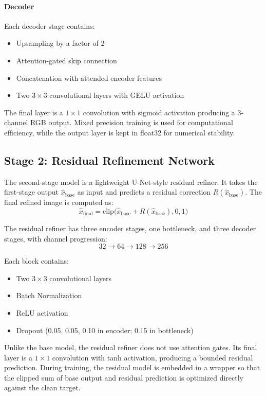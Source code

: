 \documentclass[10pt,twocolumn,letterpaper]{article}
\begin{document}
\paragraph{Decoder}
Each decoder stage contains:
\begin{itemize}
\item Upsampling by a factor of 2
\item Attention-gated skip connection
\item Concatenation with attended encoder features
\item Two $3\times3$ convolutional layers with GELU activation
\end{itemize}

The final layer is a $1\times1$ convolution with sigmoid activation producing a 3-channel RGB output. Mixed precision training is used for computational efficiency, while the output layer is kept in float32 for numerical stability.

\subsection{Stage 2: Residual Refinement Network}

The second-stage model is a lightweight U-Net-style residual refiner. It takes the first-stage output $\hat{x}_{\text{base}}$ as input and predicts a residual correction $R(\hat{x}_{\text{base}})$. The final refined image is computed as:
\begin{equation*}
\hat{x}_{\text{final}} = \mathrm{clip}\big(\hat{x}_{\text{base}} + R(\hat{x}_{\text{base}}), 0, 1\big)
\end{equation*}

The residual refiner has three encoder stages, one bottleneck, and three decoder stages, with channel progression:
\[
32 \rightarrow 64 \rightarrow 128 \rightarrow 256
\]

Each block contains:
\begin{itemize}
\item Two $3\times3$ convolutional layers
\item Batch Normalization
\item ReLU activation
\item Dropout (0.05, 0.05, 0.10 in encoder; 0.15 in bottleneck)
\end{itemize}

Unlike the base model, the residual refiner does not use attention gates. Its final layer is a $1\times1$ convolution with tanh activation, producing a bounded residual prediction. During training, the residual model is embedded in a wrapper so that the clipped sum of base output and residual prediction is optimized directly against the clean target.
\end{document}
